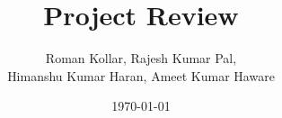\documentclass{beamer}
\begin{document}
\title{Project Review} 
\author{Roman Kollar, Rajesh Kumar Pal,\\Himanshu Kumar Haran, Ameet Kumar Haware}
\date{\today} 

\frame{\titlepage} 




\end{document}
